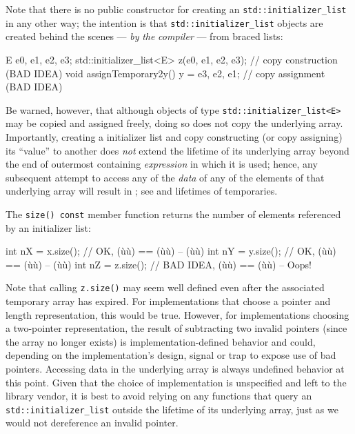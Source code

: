 \noindent Note that there is no public constructor for creating an
\lstinline!std::initializer_list! in any other way; the intention is that
\lstinline!std::initializer_list! objects are created behind the scenes
--- \emph{by} \emph{the} \emph{compiler} --- from braced lists:

\begin{emcppslisting}[emcppsbatch=e3]
E e0, e1, e2, e3;
std::initializer_list<E> z({e0, e1, e2, e3});   // copy construction (BAD IDEA)
void assignTemporary2y() { y = {e3, e2, e1}; }  // copy assignment (BAD IDEA)
\end{emcppslisting}
    

\noindent Be warned, however, that although objects of type
\lstinline!std::initializer_list<E>! may be copied and assigned freely,
doing so does not copy the underlying array. Importantly, creating a
 initializer list and copy constructing (or copy
assigning) its ``value'' to another does \emph{not} extend the lifetime
of its underlying array beyond the end of outermost containing
\emph{expression} in which it is used; hence, any subsequent attempt to
access any of the \emph{data} of any of the elements of that underlying
array will result in ; see
 and lifetimes of temporaries.

The \lstinline!size()!~\lstinline!const! member function returns the number of
elements referenced by an initializer list:

\begin{emcppslisting}[emcppsbatch=e3]
int nX = x.size();  // OK, (ù{}ù) == (ù{}ù) -- (ù{\codeincomments{\{ \}}}ù)
int nY = y.size();  // OK, (ù{}ù) == (ù{}ù) -- (ù{\codeincomments{\{ \}}}ù)
int nZ = z.size();  // BAD IDEA, (ù{}ù) == (ù{}ù) -- Oops!
\end{emcppslisting}
    

\noindent Note that calling \lstinline!z.size()! may seem well defined even after the
associated temporary array has expired. For implementations that choose
a pointer and length representation, this would be true. However, for
implementations choosing a two-pointer representation, the result of
subtracting two invalid pointers (since the array no longer exists) is
implementation-defined behavior and could, depending on the
implementation's design, signal or trap to expose use of bad pointers.
Accessing data in the underlying array is always undefined behavior at
this point. Given that the choice of implementation is unspecified and
left to the library vendor, it is best to avoid relying on any functions
that query an \lstinline!std::initializer_list! outside the lifetime of
its underlying array, just as we would not dereference an invalid
pointer.

